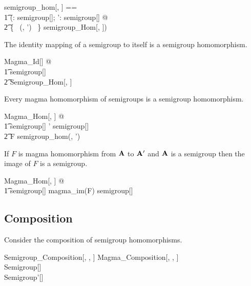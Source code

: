 \documentclass{amsart}
\begin{document}
\begin{zed}
	semigroup\_hom[\genT, \genU] == \\
	\t1	(\lambda \strucA: semigroup[\genT]; \strucA': semigroup[\genU] @ \\
	\t2		\{~ (\strucA, \strucA') ~\} \dres semigroup\_Hom[\genT, \genU])
\end{zed}

\begin{remark}
The identity mapping of a semigroup to itself is a semigroup homomorphism.

\begin{zed}
	\forall Magma\_Id[\setT] @ \\
	\t1	\strucA \in semigroup[\setT] \implies \\
	\t2		Semigroup\_Hom[\setT, \setT]
\end{zed}

\end{remark}

\begin{remark}
Every magma homomorphism of semigroups is a semigroup homomorphism.

\begin{zed}
	\forall Magma\_Hom[\setT, \setU] @ \\
	\t1 \strucA \in semigroup[\setT] \land \strucA' \in semigroup[\setU] \implies \\
	\t2		F \in semigroup\_hom(\strucA, \strucA')
\end{zed}

\end{remark}

\begin{remark}
If $F$ is magma homomorphism from $\mathbf{A}$ to $\mathbf{A}'$ and $\mathbf{A}$ is a semigroup
then the image of $F$ is a semigroup.

\begin{zed}
	\forall Magma\_Hom[\setT, \setU] @ \\
	\t1	\strucA \in semigroup[\setT] \implies magma\_im(F) \in semigroup[\setU]
\end{zed}

\end{remark}

\subsection{Composition}

Consider the composition of semigroup homomorphisms.

\begin{schema}{Semigroup\_Composition}[\genT, \genU, \genV]
	Magma\_Composition[\genT, \genU, \genV] \\
	Semigroup[\genT] \\
	Semigroup'[\genU]
\end{schema}
\end{document}
